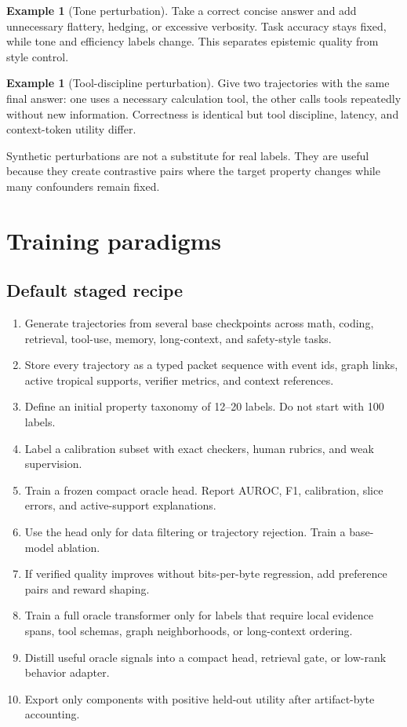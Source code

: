 \documentclass[11pt]{article}
\theoremstyle{definition}
\newtheorem{example}[theorem]{Example}
\theoremstyle{remark}
\numberwithin{equation}{section}
\begin{document}
\begin{example}[Tone perturbation]
Take a correct concise answer and add unnecessary flattery, hedging, or excessive verbosity.  Task accuracy stays fixed, while tone and efficiency labels change.  This separates epistemic quality from style control.
\end{example}

\begin{example}[Tool-discipline perturbation]
Give two trajectories with the same final answer: one uses a necessary calculation tool, the other calls tools repeatedly without new information.  Correctness is identical but tool discipline, latency, and context-token utility differ.
\end{example}

Synthetic perturbations are not a substitute for real labels.  They are useful because they create contrastive pairs where the target property changes while many confounders remain fixed.

\section{Training paradigms}

\subsection{Default staged recipe}

\begin{enumerate}
    \item Generate trajectories from several base checkpoints across math, coding, retrieval, tool-use, memory, long-context, and safety-style tasks.
    \item Store every trajectory as a typed packet sequence with event ids, graph links, active tropical supports, verifier metrics, and context references.
    \item Define an initial property taxonomy of 12--20 labels.  Do not start with 100 labels.
    \item Label a calibration subset with exact checkers, human rubrics, and weak supervision.
    \item Train a frozen compact oracle head.  Report AUROC, F1, calibration, slice errors, and active-support explanations.
    \item Use the head only for data filtering or trajectory rejection.  Train a base-model ablation.
    \item If verified quality improves without bits-per-byte regression, add preference pairs and reward shaping.
    \item Train a full oracle transformer only for labels that require local evidence spans, tool schemas, graph neighborhoods, or long-context ordering.
    \item Distill useful oracle signals into a compact head, retrieval gate, or low-rank behavior adapter.
    \item Export only components with positive held-out utility after artifact-byte accounting.
\end{enumerate}
\end{document}
